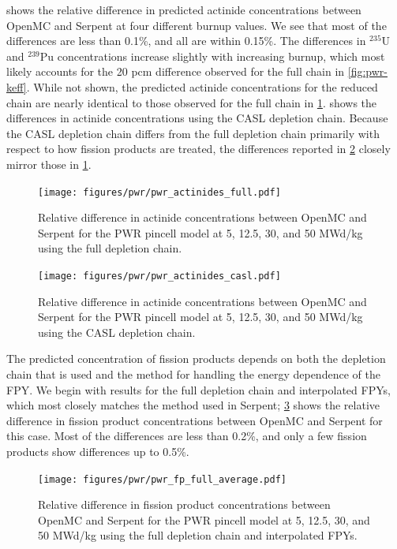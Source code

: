 \documentclass[3p,authoryear]{elsarticle}
\begin{document}
 shows the relative difference in predicted
actinide concentrations between OpenMC and Serpent at four different burnup
values. We see that most of the differences are less than 0.1\%, and all are
within 0.15\%. The differences in $^{235}$U and $^{239}$Pu concentrations
increase slightly with increasing burnup, which most likely accounts for the 20
pcm difference observed for the full chain in \cref{fig:pwr-keff}. While not
shown, the predicted actinide concentrations for the reduced chain are nearly
identical to those observed for the full chain in \cref{fig:pwr-actinides-full}.
 shows the differences in actinide concentrations
using the CASL depletion chain. Because the CASL depletion chain differs from
the full depletion chain primarily with respect to how fission products are
treated, the differences reported in \cref{fig:pwr-actinides-casl} closely
mirror those in \cref{fig:pwr-actinides-full}.
\begin{figure}[H]
  \centering
  \texttt{[image: figures/pwr/pwr\_actinides\_full.pdf]}
  \caption{Relative difference in actinide concentrations between OpenMC and
  Serpent for the PWR pincell model at 5, 12.5, 30, and 50 MWd/kg using the full
  depletion chain.}
  \label{fig:pwr-actinides-full}
\end{figure}
\begin{figure}[H]
  \centering
  \texttt{[image: figures/pwr/pwr\_actinides\_casl.pdf]}
  \caption{Relative difference in actinide concentrations between OpenMC and
  Serpent for the PWR pincell model at 5, 12.5, 30, and 50 MWd/kg using the CASL
  depletion chain.}
  \label{fig:pwr-actinides-casl}
\end{figure}

The predicted concentration of fission products depends on both the depletion
chain that is used and the method for handling the energy dependence of the FPY.
We begin with results for the full depletion chain and interpolated FPYs, which
most closely matches the method used in Serpent; \cref{fig:pwr-fp-full-average}
shows the relative difference in fission product concentrations between OpenMC
and Serpent for this case. Most of the differences are less than 0.2\%, and only
a few fission products show differences up to 0.5\%.
\begin{figure}[H]
  \centering
  \texttt{[image: figures/pwr/pwr\_fp\_full\_average.pdf]}
  \caption{Relative difference in fission product concentrations between OpenMC
  and Serpent for the PWR pincell model at 5, 12.5, 30, and 50 MWd/kg using the
  full depletion chain and interpolated FPYs.}
  \label{fig:pwr-fp-full-average}
\end{figure}
\end{document}
